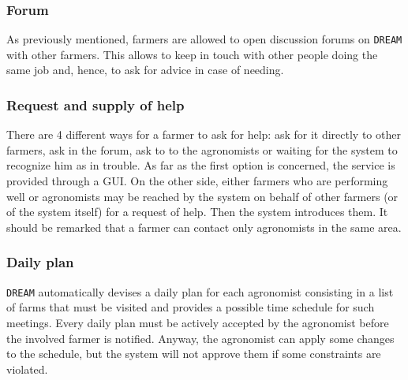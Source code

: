 \documentclass{article}
\begin{document}
\subsubsection{Forum}
As previously mentioned, farmers are allowed to open discussion forums on \verb|DREAM| with other farmers. 
This allows to keep in touch with other people doing the same job and, hence, to ask for advice in case of 
needing.
\subsubsection{Request and supply of help}
There are 4 different ways for a farmer to ask for help: ask for it directly to other farmers, ask in the forum, ask to to
the agronomists or waiting for the system to recognize him as in trouble. As far as the first option is 
concerned, the service is provided through a GUI. On the other side, either farmers who are performing 
well or agronomists may be reached by the system on behalf of other farmers (or of the system itself) for a 
request of help. Then the system introduces them. It should be remarked that a farmer can contact only 
agronomists in the same area.
\subsubsection{Daily plan}
\verb|DREAM| automatically devises a daily plan for each agronomist consisting in a list of farms that must be visited and provides a possible time schedule for such meetings. Every daily plan must be actively accepted 
by the agronomist before the involved farmer is notified. Anyway, the agronomist can apply some changes 
to the schedule, but the system will not approve them if some constraints are violated.
\end{document}

